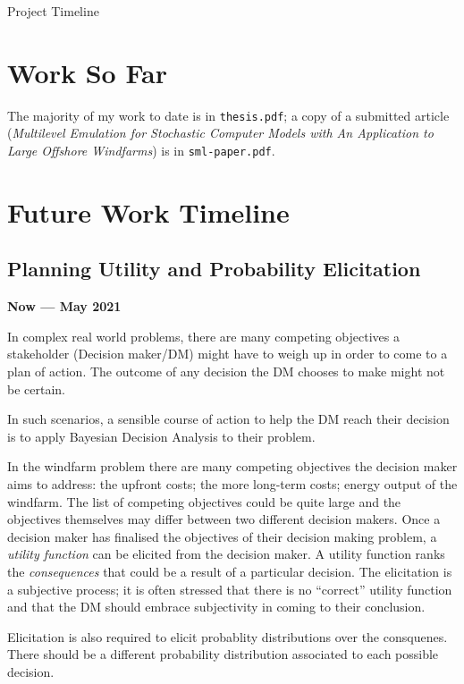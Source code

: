 \begin{chapter}{Project Timeline}

\section{Work So Far}

The majority of my work to date is in \texttt{thesis.pdf}; a copy of a submitted article (\textit{Multilevel Emulation for Stochastic Computer Models with An Application to Large Offshore Windfarms}) is in \texttt{sml-paper.pdf}.

\section{Future Work Timeline}

\subsection{Planning Utility and Probability Elicitation}

\textbf{Now --- May 2021} 

In complex real world problems, there are many competing objectives a stakeholder (Decision maker/DM) might have to weigh up in order to come to a plan of action. The outcome of any decision the DM chooses to make might not be certain.

In such scenarios, a sensible course of action to help the DM reach their decision is to apply Bayesian Decision Analysis to their problem.

In the windfarm problem there are many competing objectives the decision maker aims to address: the upfront costs; the more long-term costs; energy output of the windfarm. The list of competing objectives could be quite large and the objectives themselves may differ between two different decision makers. Once a decision maker has finalised the objectives of their decision making problem, a \textit{utility function} can be elicited from the decision maker. A utility function ranks the \textit{consequences} that could be a result of a particular decision. The elicitation is a subjective process; it is often stressed that there is no ``correct'' utility function and that the DM should embrace subjectivity in coming to their conclusion.

Elicitation is also required to elicit probablity distributions over the consquenes. There should be a different probability distribution associated to each possible decision.


\end{chapter}
